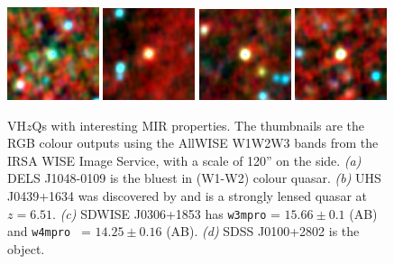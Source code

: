 \documentclass[usenatbib]{mnras}
\begin{document}
\begin{figure}
    \centering
     \includegraphics[width=0.24\textwidth]{figures/DELS_J1048-0109.png} 
   \includegraphics[width=0.24\textwidth]{figures/UHS_J0439+1634.png} 
    \includegraphics[width=0.24\textwidth]{figures/SDWISE_J0306+1853.png}
   \includegraphics[width=0.24\textwidth]{figures/SDSS_J0100+2802.png}
    \caption{VH$z$Qs with interesting MIR properties. 
      The thumbnails are the RGB colour outputs using the AllWISE W1W2W3 bands from the 
      IRSA WISE Image Service, with a scale of 120'' on the side. 
      {\it (a)} DELS J1048-0109 is the bluest in (W1-W2) colour quasar. 
      {\it (b)} UHS J0439+1634 was discovered by \citet{Fan2019} and is a strongly lensed quasar at $z=6.51$. 
      {\it (c)} SDWISE J0306+1853 has {\tt w3mpro} = $15.66\pm0.1$ (AB) and {\tt w4mpro } = $14.25\pm0.16$ (AB). 
      {\it (d)} SDSS J0100+2802 is the \citet{Wu2015} object.}
    \label{fig:VHzQ_W4s}
\end{figure}
\end{document}
